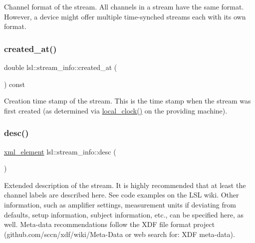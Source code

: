 Channel format of the stream. All channels in a stream have the same format. However, a device might offer multiple time-\/synched streams each with its own format. \mbox{\label{classlsl_1_1stream__info_a9a5be16db42c09b1f0cced52a2259db8}} 
\subsubsection{\texorpdfstring{created\+\_\+at()}{created\_at()}}
{\footnotesize\ttfamily double lsl\+::stream\+\_\+info\+::created\+\_\+at (\begin{DoxyParamCaption}{ }\end{DoxyParamCaption}) const\hspace{0.3cm}{\ttfamily [inline]}}

Creation time stamp of the stream. This is the time stamp when the stream was first created (as determined via \hyperlink{namespacelsl_ae1766ae2ab66141cb927612e57a0c8c6}{local\+\_\+clock()} on the providing machine). \mbox{\label{classlsl_1_1stream__info_a7bbc53bb041757eb87c6c73564981390}} 
\subsubsection{\texorpdfstring{desc()}{desc()}}
{\footnotesize\ttfamily \hyperlink{classlsl_1_1xml__element}{xml\+\_\+element} lsl\+::stream\+\_\+info\+::desc (\begin{DoxyParamCaption}{ }\end{DoxyParamCaption})\hspace{0.3cm}{\ttfamily [inline]}}

Extended description of the stream. It is highly recommended that at least the channel labels are described here. See code examples on the L\+SL wiki. Other information, such as amplifier settings, measurement units if deviating from defaults, setup information, subject information, etc., can be specified here, as well. Meta-\/data recommendations follow the X\+DF file format project (github.\+com/sccn/xdf/wiki/\+Meta-\/\+Data or web search for\+: X\+DF meta-\/data).

